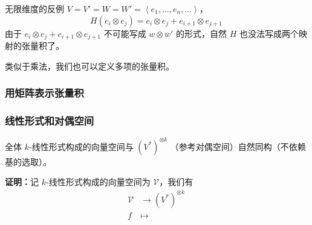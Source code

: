 

\begin{example}{无限维度的反例}
$V = V' = W = W' = \left\langle e_1, \dots, e_n, \dots \right\rangle$，
\begin{equation}
H(e_i \otimes e_j) = e_i \otimes e_j + e_{i + 1} \otimes e_{j + 1}~
\end{equation}
由于 $e_i \otimes e_j + e_{i + 1} \otimes e_{j + 1}$ 不可能写成 $w \otimes w'$ 的形式，自然 $H$ 也没法写成两个映射的张量积了。

\end{example}

类似于乘法，我们也可以定义多项的张量积。

\subsubsection{用矩阵表示张量积}



\subsubsection{线性形式和对偶空间}

\begin{theorem}{}
全体 $k$-线性形式构成的向量空间与 $(V^*)^{\otimes k}$ （参考对偶空间）自然同构（不依赖基的选取）。
\end{theorem}
\textbf{证明：}记 $k$-线性形式构成的向量空间为 $\mathcal{V}$，我们有
\begin{equation}
\begin{aligned}
\mathcal{V} &\to (V^*)^{\otimes k} \\
f &\mapsto 
\end{aligned}~
\end{equation}


